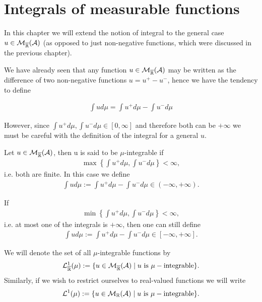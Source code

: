 

\chapter{Integrals of measurable functions}

In this chapter we will extend the notion of integral to the general case $u \in \mathcal{M}_{\overline{\mathbb{R}}}(\mathcal{A})$ (as opposed to just non-negative functions, which were discussed in the previous chapter).

We have already seen that any function $u \in \mathcal{M}_{\overline{\mathbb{R}}}(\mathcal{A})$ may be written as the difference of two non-negative functions $u = u^+ - u^-$, hence we have the tendency to define

\begin{align*}
	\int u d\mu = \int u^+ d\mu - \int u^- d \mu
\end{align*}

However, since $\int u^+ d\mu, \int u^- d\mu \in [0, \infty]$ and therefore both can be $+\infty$ we must be careful with the definition of the integral for a general $u$.


\begin{dfn}[$\mu$-integrable]
	\label{dfn:mu-integrable}
	Let $u \in \mathcal{M}_{\overline{\mathbb{R}}}(\mathcal{A})$, then u is said to be $\mu$-integrable if
	\begin{align}
		\max\left\{ \int u^+ d\mu, \int u^- d\mu \right\} < \infty,
	\end{align}
	i.e. both are finite. In this case we define
	\begin{align}
		\int u d\mu := \int u^+ d\mu - \int u^- d\mu \in (-\infty, +\infty).
	\end{align}
\end{dfn}

\begin{remark}
	If
	\begin{align*}
		\min\left\{ \int u^+ d\mu, \int u^- d\mu \right\} < \infty,
	\end{align*}
	i.e. at most one of the integrals is $+\infty$, then one can still define
	\begin{align*}
	\int u d\mu := \int u^+ d\mu - \int u^- d\mu \in [-\infty, +\infty].
	\end{align*}
\end{remark}

We will denote the set of all $\mu$-integrable functions by
\begin{align}
	\mathcal{L}^1_{\overline{\mathbb{R}}}(\mu) := \{u \in \mathcal{M}_{\overline{\mathbb{R}}}(\mathcal{A}) \mid u \text{ is } \mu-\text{integrable}\}.
\end{align}
Similarly, if we wish to restrict ourselves to real-valued functions we will write
\begin{align}
\mathcal{L}^1(\mu) := \{u \in \mathcal{M}_{\mathbb{R}}(\mathcal{A}) \mid u \text{ is } \mu-\text{integrable}\}.
\end{align}


